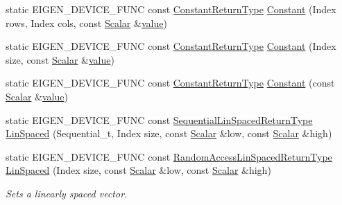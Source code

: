 \begin{DoxyCompactItemize}
\item 
static E\+I\+G\+E\+N\+\_\+\+D\+E\+V\+I\+C\+E\+\_\+\+F\+U\+NC const \mbox{\hyperlink{class_eigen_1_1_cwise_nullary_op}{Constant\+Return\+Type}} \mbox{\hyperlink{class_eigen_1_1_dense_base_ab0ae1bfa72faedcaf53af81ca76c446b}{Constant}} (Index rows, Index cols, const \mbox{\hyperlink{class_eigen_1_1_dense_base_a5feed465b3a8e60c47e73ecce83e39a2}{Scalar}} \&\mbox{\hyperlink{class_eigen_1_1_dense_base_a8da735a6bfc7012606acf787156d10a0}{value}})
\item 
static E\+I\+G\+E\+N\+\_\+\+D\+E\+V\+I\+C\+E\+\_\+\+F\+U\+NC const \mbox{\hyperlink{class_eigen_1_1_cwise_nullary_op}{Constant\+Return\+Type}} \mbox{\hyperlink{class_eigen_1_1_dense_base_ad8236107f739860be6a5debeede8fdbf}{Constant}} (Index size, const \mbox{\hyperlink{class_eigen_1_1_dense_base_a5feed465b3a8e60c47e73ecce83e39a2}{Scalar}} \&\mbox{\hyperlink{class_eigen_1_1_dense_base_a8da735a6bfc7012606acf787156d10a0}{value}})
\item 
static E\+I\+G\+E\+N\+\_\+\+D\+E\+V\+I\+C\+E\+\_\+\+F\+U\+NC const \mbox{\hyperlink{class_eigen_1_1_cwise_nullary_op}{Constant\+Return\+Type}} \mbox{\hyperlink{class_eigen_1_1_dense_base_a9053c1a2e9993febe50113b05aac0f20}{Constant}} (const \mbox{\hyperlink{class_eigen_1_1_dense_base_a5feed465b3a8e60c47e73ecce83e39a2}{Scalar}} \&\mbox{\hyperlink{class_eigen_1_1_dense_base_a8da735a6bfc7012606acf787156d10a0}{value}})
\item 
static E\+I\+G\+E\+N\+\_\+\+D\+E\+V\+I\+C\+E\+\_\+\+F\+U\+NC const \mbox{\hyperlink{class_eigen_1_1_cwise_nullary_op}{Sequential\+Lin\+Spaced\+Return\+Type}} \mbox{\hyperlink{class_eigen_1_1_dense_base_a35f222d8834f34fd358f2ef7bb52c888}{Lin\+Spaced}} (Sequential\+\_\+t, Index size, const \mbox{\hyperlink{class_eigen_1_1_dense_base_a5feed465b3a8e60c47e73ecce83e39a2}{Scalar}} \&low, const \mbox{\hyperlink{class_eigen_1_1_dense_base_a5feed465b3a8e60c47e73ecce83e39a2}{Scalar}} \&high)
\item 
static E\+I\+G\+E\+N\+\_\+\+D\+E\+V\+I\+C\+E\+\_\+\+F\+U\+NC const \mbox{\hyperlink{class_eigen_1_1_cwise_nullary_op}{Random\+Access\+Lin\+Spaced\+Return\+Type}} \mbox{\hyperlink{class_eigen_1_1_dense_base_a513c7986f48517c36f992a558f81e591}{Lin\+Spaced}} (Index size, const \mbox{\hyperlink{class_eigen_1_1_dense_base_a5feed465b3a8e60c47e73ecce83e39a2}{Scalar}} \&low, const \mbox{\hyperlink{class_eigen_1_1_dense_base_a5feed465b3a8e60c47e73ecce83e39a2}{Scalar}} \&high)
\begin{DoxyCompactList}\small\item\em Sets a linearly spaced vector. \end{DoxyCompactList}\item 

\end{DoxyCompactItemize}
